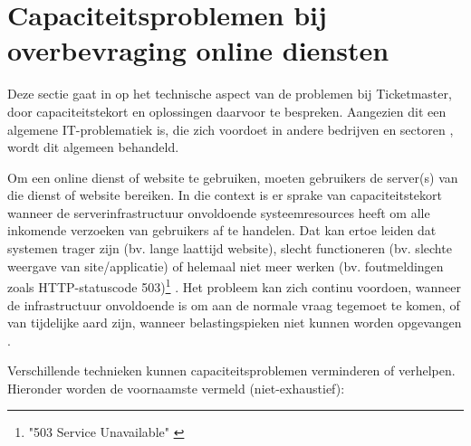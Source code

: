 
\section{Capaciteitsproblemen bij overbevraging online diensten}

Deze sectie gaat in op het technische aspect van de problemen bij Ticketmaster,
door capaciteitstekort en oplossingen daarvoor te bespreken. Aangezien dit
een algemene IT-problematiek is, die zich voordoet in andere bedrijven en
sectoren \cite{warren2023chatgpt, warren2020discord, reuters2023what},
wordt dit algemeen behandeld. 

Om een online dienst of website te gebruiken, moeten gebruikers de
server(s) van die dienst of website bereiken. In die context is er sprake van
capaciteitstekort wanneer de serverinfrastructuur onvoldoende systeemresources
heeft om alle inkomende verzoeken van gebruikers af te handelen.
Dat kan ertoe leiden dat systemen trager zijn (bv. lange laattijd website),
slecht functioneren (bv. slechte weergave van site/applicatie) of
helemaal niet meer werken (bv. foutmeldingen zoals HTTP-statuscode
503)\footnote{"503 Service Unavailable" \cite{fielding2022http}}
\cite{guitart2010survey, guitart2007designing}.
Het probleem kan zich continu voordoen, wanneer de infrastructuur onvoldoende
is om aan de normale vraag tegemoet te komen,
of van tijdelijke aard zijn, wanneer belastingspieken niet kunnen worden
opgevangen \cite{schroeder2006web}.

Verschillende technieken kunnen capaciteitsproblemen verminderen of
verhelpen. Hieronder worden de voornaamste vermeld (niet-exhaustief):

